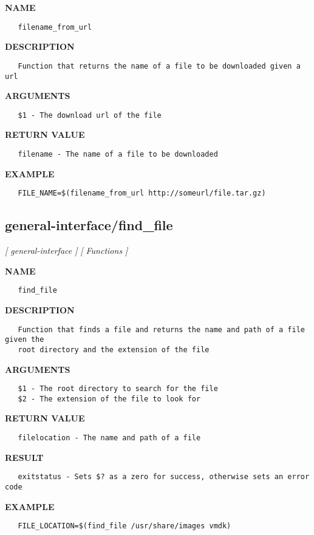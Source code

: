 \label{ch:robo30}
\label{ch:general_interface_filename_from_url}
\textbf{NAME}
\begin{verbatim}
   filename_from_url
\end{verbatim}
\textbf{DESCRIPTION}
\begin{verbatim}
   Function that returns the name of a file to be downloaded given a url
\end{verbatim}
\textbf{ARGUMENTS}
\begin{verbatim}
   $1 - The download url of the file
\end{verbatim}
\textbf{RETURN VALUE}
\begin{verbatim}
   filename - The name of a file to be downloaded
\end{verbatim}
\textbf{EXAMPLE}
\begin{verbatim}
   FILE_NAME=$(filename_from_url http://someurl/file.tar.gz)
\end{verbatim}
\newpage
\subsection{general-interface/find\_file}
\textsl{[ general-interface ]}
\textsl{[ Functions ]}

\label{ch:robo31}
\label{ch:general_interface_find_file}
\textbf{NAME}
\begin{verbatim}
   find_file
\end{verbatim}
\textbf{DESCRIPTION}
\begin{verbatim}
   Function that finds a file and returns the name and path of a file given the 
   root directory and the extension of the file
\end{verbatim}
\textbf{ARGUMENTS}
\begin{verbatim}
   $1 - The root directory to search for the file
   $2 - The extension of the file to look for
\end{verbatim}
\textbf{RETURN VALUE}
\begin{verbatim}
   filelocation - The name and path of a file
\end{verbatim}
\textbf{RESULT}
\begin{verbatim}
   exitstatus - Sets $? as a zero for success, otherwise sets an error code
\end{verbatim}
\textbf{EXAMPLE}
\begin{verbatim}
   FILE_LOCATION=$(find_file /usr/share/images vmdk)
\end{verbatim}
\newpage
